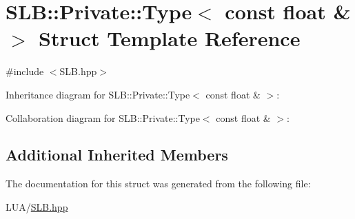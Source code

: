 \hypertarget{structSLB_1_1Private_1_1Type_3_01const_01float_01_6_01_4}{}\section{S\+LB\+:\+:Private\+:\+:Type$<$ const float \& $>$ Struct Template Reference}
\label{structSLB_1_1Private_1_1Type_3_01const_01float_01_6_01_4}


{\ttfamily \#include $<$S\+L\+B.\+hpp$>$}



Inheritance diagram for S\+LB\+:\+:Private\+:\+:Type$<$ const float \& $>$\+:


Collaboration diagram for S\+LB\+:\+:Private\+:\+:Type$<$ const float \& $>$\+:
\subsection*{Additional Inherited Members}


The documentation for this struct was generated from the following file\+:\begin{DoxyCompactItemize}
\item 
L\+U\+A/\hyperlink{SLB_8hpp}{S\+L\+B.\+hpp}\end{DoxyCompactItemize}
